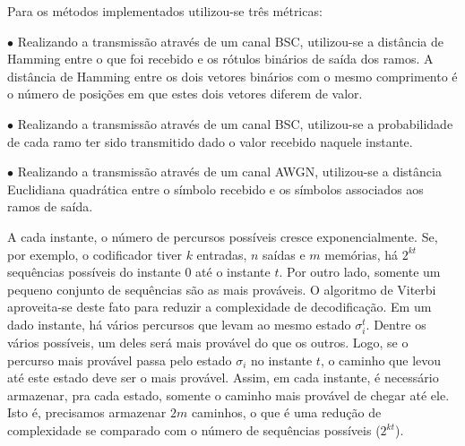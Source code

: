 Para os métodos implementados utilizou-se três métricas:

$\bullet$ Realizando a transmissão através de um canal BSC, utilizou-se a distância de Hamming entre o que foi recebido e os rótulos binários de saída dos ramos. A distância de Hamming entre os dois vetores binários com o mesmo comprimento é o número de posições em que estes dois vetores diferem de valor.

$\bullet$ Realizando a transmissão através de um canal BSC, utilizou-se a probabilidade de cada ramo ter sido transmitido dado o valor recebido naquele instante.

$\bullet$ Realizando a transmissão através de um canal AWGN, utilizou-se a distância Euclidiana quadrática entre o símbolo recebido e os símbolos associados aos ramos de saída.

A cada instante, o número de percursos possíveis cresce exponencialmente. Se, por exemplo, o codificador tiver $k$ entradas, $n$ saídas e $m$ memórias, há $2^{kt}$ sequências possíveis do instante $0$ até o instante $t$. Por outro lado, somente um pequeno conjunto de sequências são as mais prováveis. O algoritmo de Viterbi aproveita-se deste fato para reduzir a complexidade de decodificação. Em um dado instante, há vários percursos que levam ao mesmo estado $\sigma_{i}^{t}$. Dentre os vários possíveis, um deles será mais provável do que os outros. Logo, se o percurso mais provável passa pelo estado $\sigma_{i}$ no instante $t$, o caminho que levou até este estado deve ser o mais provável. Assim, em cada instante, é necessário
armazenar, pra cada estado, somente o caminho mais provável de chegar até ele. Isto é, precisamos armazenar $2m$ caminhos, o que é uma redução de complexidade se comparado com o número de sequências possíveis ($2^{kt}$).

